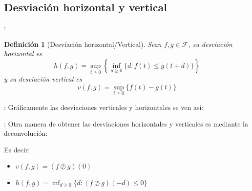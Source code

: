 \documentclass[xcolor={x11names}]{beamer}
\newtheorem{definicion}{Definición}[section]
\begin{document}
\subsection{Desviación horizontal y vertical}

\begin{frame}{\secname: \subsecname}
    \begin{definicion}[Desviación horizontal/Vertical]
        Sean $f,g\in\mathcal{F}$, su
        desviación horizontal es
        \begin{equation*}
            h(f,g)=\sup_{t\geq0}\left\{
                \inf_{d\geq0}
                \{d: f(t)\leq g(t+d)\}
            \right\}
        \end{equation*}
        y su desviación vertical es
        \begin{equation*}
            v(f,g)=\sup_{t\geq0}
            \{f(t)-g(t)\}
        \end{equation*}
    \end{definicion}
\end{frame}





\begin{frame}{\secname: \subsecname}
    Gráficamente las desviaciones
    verticales y horizontales se ven así:

    \vfill

    \begin{figure}[h]
        \centering
        
    \end{figure}
\end{frame}




\begin{frame}{\secname: \subsecname}
    Otra manera de obtener las desviaciones
    horizontales y verticales es mediante
    la deconvolución:

    \vfill

    \begin{figure}[h]
        \centering
        
    \end{figure}

    Es decir:
    \begin{itemize}
        \item $v(f,g)=(f\oslash g)(0)$
        \item $h(f,g)=\inf_{d\geq0}
            \{d: (f\oslash g)(-d)\leq0\}$
    \end{itemize}
\end{frame}
\end{document}
